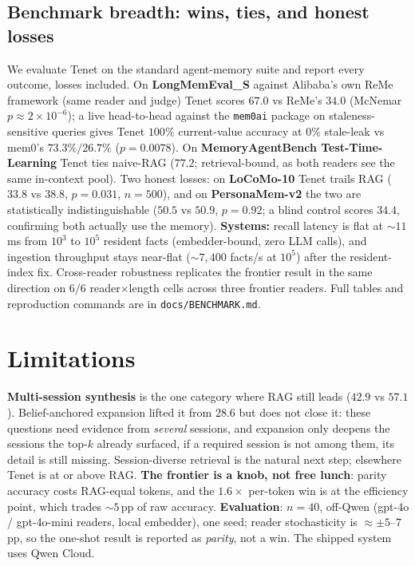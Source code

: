 \documentclass[11pt]{article}
\begin{document}
\subsection{Benchmark breadth: wins, ties, and honest losses}
We evaluate Tenet on the standard agent-memory suite and report every outcome, losses
included. On \textbf{LongMemEval\_S} against Alibaba's own ReMe framework (same reader and
judge) Tenet scores $67.0$ vs ReMe's $34.0$ (McNemar $p\approx2\times10^{-6}$); a live
head-to-head against the \texttt{mem0ai} package on staleness-sensitive queries gives Tenet
$100\%$ current-value accuracy at $0\%$ stale-leak vs mem0's $73.3\%/26.7\%$ ($p=0.0078$). On
\textbf{MemoryAgentBench Test-Time-Learning} Tenet ties naive-RAG ($77.2$; retrieval-bound, as
both readers see the same in-context pool). Two honest losses: on \textbf{LoCoMo-10} Tenet
trails RAG ($33.8$ vs $38.8$, $p=0.031$, $n{=}500$), and on \textbf{PersonaMem-v2} the two are
statistically indistinguishable ($50.5$ vs $50.9$, $p=0.92$; a blind control scores $34.4$,
confirming both actually use the memory). \textbf{Systems:} recall latency is flat at
$\sim$$11$\,ms from $10^3$ to $10^5$ resident facts (embedder-bound, zero LLM calls), and
ingestion throughput stays near-flat ($\sim$$7{,}400$ facts/s at $10^5$) after the
resident-index fix. Cross-reader robustness replicates the frontier result in the same
direction on $6/6$ reader$\times$length cells across three frontier readers. Full tables and
reproduction commands are in \texttt{docs/BENCHMARK.md}.

\section{Limitations}
\textbf{Multi-session synthesis} is the one category where RAG still leads ($42.9$ vs $57.1$).
Belief-anchored expansion lifted it from $28.6$ but does not close it: these questions need
evidence from \emph{several} sessions, and expansion only deepens the sessions the top-$k$
already surfaced, if a required session is not among them, its detail is still missing.
Session-diverse retrieval is the natural next step; elsewhere Tenet is at or above RAG.
\textbf{The frontier is a knob, not free lunch}: parity accuracy costs RAG-equal tokens, and
the $1.6\times$ per-token win is at the efficiency point, which trades ${\sim}5$\,pp of raw
accuracy. \textbf{Evaluation}: $n{=}40$, off-Qwen (gpt-4o / gpt-4o-mini readers, local
embedder), one seed; reader stochasticity is ${\approx}{\pm}5$--$7$\,pp, so the one-shot result
is reported as \emph{parity}, not a win. The shipped system uses Qwen Cloud.
\end{document}
